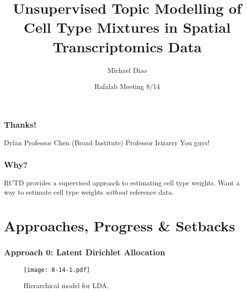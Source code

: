 \documentclass{beamer}
\title{Unsupervised Topic Modelling of Cell Type Mixtures in Spatial Transcriptomics Data}
\date{Rafalab Meeting 8/14}
\author{Michael Diao}
\begin{document}
\maketitle

\begin{frame}
    \frametitle{Thanks!}
    \begin{itemize}
        \ii
        Dylan
        \ii
        Professor Chen (Broad Institute)
        \ii
        Professor Irizarry
        \ii
        You guys!
    \end{itemize}
\end{frame}

\begin{frame}
    \frametitle{Why?}

    \begin{itemize}
        \ii RCTD provides a
        \alert{supervised} approach to estimating 
        cell type weights.
        \ii Want a way to estimate cell type weights \textit{without} reference data.
    \end{itemize}
\end{frame}

\section{Approaches, Progress \& Setbacks}

\begin{frame}
    \frametitle{Approach 0: Latent Dirichlet Allocation}
    \begin{figure}[!htbp]
        \centering
        \texttt{[image: 8-14-1.pdf]}
        \caption{Hierarchical model for LDA.}
    \end{figure}
\end{frame}
\end{document}
